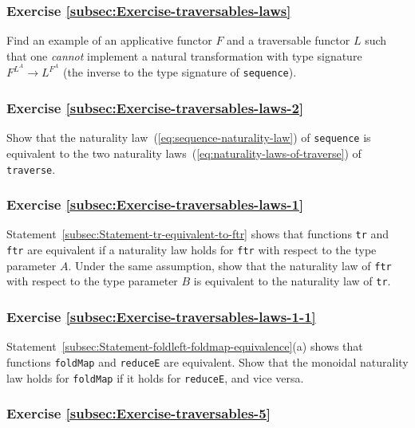 \subsubsection{Exercise \label{subsec:Exercise-traversables-laws}\ref{subsec:Exercise-traversables-laws}}

Find an example of an applicative functor $F$ and a traversable functor
$L$ such that one \emph{cannot} implement a natural transformation
with type signature $F^{L^{A}}\rightarrow L^{F^{A}}$ (the inverse
to the type signature of \lstinline!sequence!).

\subsubsection{Exercise \label{subsec:Exercise-traversables-laws-2}\ref{subsec:Exercise-traversables-laws-2}}

Show that the naturality law~(\ref{eq:sequence-naturality-law})
of \lstinline!sequence! is equivalent to the two naturality laws~(\ref{eq:naturality-laws-of-traverse})
of \lstinline!traverse!.

\subsubsection{Exercise \label{subsec:Exercise-traversables-laws-1}\ref{subsec:Exercise-traversables-laws-1}}

Statement~\ref{subsec:Statement-tr-equivalent-to-ftr} shows that
functions \lstinline!tr! and \lstinline!ftr! are equivalent if a
naturality law holds for \lstinline!ftr! with respect to the type
parameter $A$. Under the same assumption, show that the naturality
law of \lstinline!ftr! with respect to the type parameter $B$ is
equivalent to the naturality law of \lstinline!tr!.

\subsubsection{Exercise \label{subsec:Exercise-traversables-laws-1-1}\ref{subsec:Exercise-traversables-laws-1-1}}

Statement~\ref{subsec:Statement-foldleft-foldmap-equivalence}(a)
shows that functions \lstinline!foldMap! and \lstinline!reduceE!
are equivalent. Show that the monoidal naturality law holds for \lstinline!foldMap!
if it holds for \lstinline!reduceE!, and vice versa.

\subsubsection{Exercise \label{subsec:Exercise-traversables-5}\ref{subsec:Exercise-traversables-5}}

